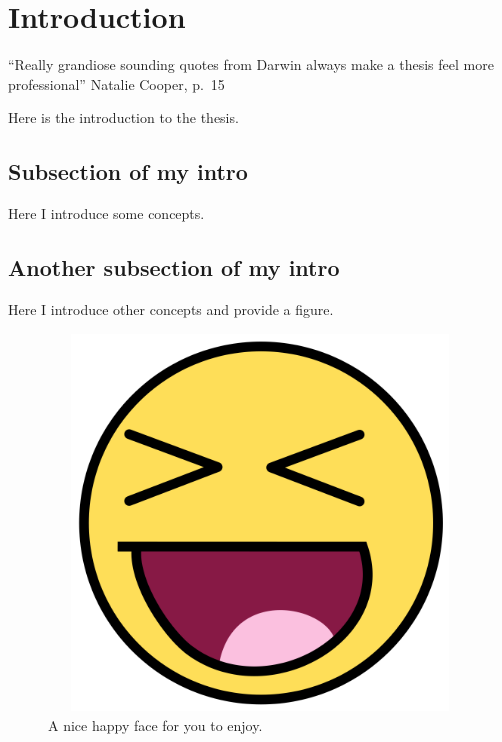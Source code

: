 \chapter{Introduction}
\label{chap:introduction}%

\begin{quoteshrink}
  ``Really grandiose sounding quotes from Darwin always make a thesis feel more professional''
  \hfill{Natalie Cooper, p.~15}
\end{quoteshrink}

\noindent
Here is the introduction to the thesis.

\section{Subsection of my intro}

Here I introduce some concepts.


\section{Another subsection of my intro}

Here I introduce other concepts and provide a figure.

\begin{figure} %
  \centering
  \includegraphics[width = 30cm, height = 10cm, keepaspectratio=true]{ch1-introduction/Happy_smiley_face.png}
  \caption[Happy face because I finished]%
  {A nice happy face for you to enjoy.}%
\label{fig:happy}
\end{figure}


